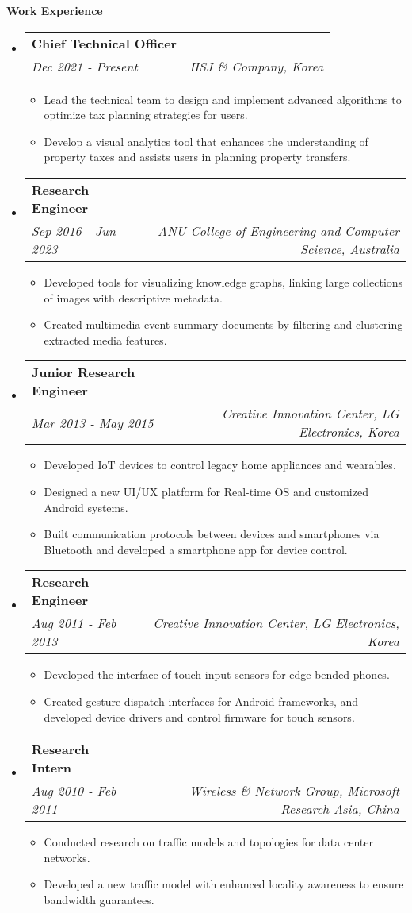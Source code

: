 \documentclass[letterpaper,11pt]{article}
\makeatletter
\newcommand{\resitem}[1]{\item #1 \vspace{-2pt}}
\newcommand{\resheading}[1]{{\large \colorbox{mygrey}{\begin{minipage}{\textwidth}{\textbf{#1 \vphantom{p\^{E}}}}\end{minipage}}}}
\newcommand{\ressubheading}[3]{
\begin{tabular*}{7.0in}{l@{\extracolsep{\fill}}r}
		\textbf{#1} &  \\
		\textit{#3} & \textit{#2}\\
\end{tabular*}\vspace{-6pt}}
\makeatother
\begin{document}
\resheading{Work Experience}
\begin{itemize}
\item
	\ressubheading{Chief Technical Officer}{HSJ \& Company, Korea}{Dec 2021 - Present}
	\begin{itemize}
		\resitem{Lead the technical team to design and implement advanced algorithms to optimize tax planning strategies for users.}
		\resitem{Develop a visual analytics tool that enhances the understanding of property taxes and assists users in planning property transfers.}
	\end{itemize}

\item
	\ressubheading{Research Engineer}{ANU College of Engineering and Computer Science, Australia}{Sep 2016 - Jun 2023}
	\begin{itemize}
		\resitem{Developed tools for visualizing knowledge graphs, linking large collections of images with descriptive metadata.}
		\resitem{Created multimedia event summary documents by filtering and clustering extracted media features.}
	\end{itemize}
	
\item
	\ressubheading{Junior Research Engineer}{Creative Innovation Center, LG Electronics, Korea}{Mar 2013 - May 2015}
	\begin{itemize}
		\resitem{Developed IoT devices to control legacy home appliances and wearables.}
		\resitem{Designed a new UI/UX platform for Real-time OS and customized Android systems.}
		\resitem{Built communication protocols between devices and smartphones via Bluetooth and developed a smartphone app for device control.}
	\end{itemize}
\item
	\ressubheading{Research Engineer}{Creative Innovation Center, LG Electronics, Korea}{Aug 2011 - Feb 2013}
	\begin{itemize}
		\resitem{Developed the interface of touch input sensors for edge-bended phones.}
		\resitem{Created gesture dispatch interfaces for Android frameworks, and developed device drivers and control firmware for touch sensors.}
	\end{itemize}

\item
	\ressubheading{Research Intern}{Wireless \& Network Group, Microsoft Research Asia, China}{Aug 2010 - Feb 2011}
	\begin{itemize}
		\resitem{Conducted research on traffic models and topologies for data center networks.}
        \resitem{Developed a new traffic model with enhanced locality awareness to ensure bandwidth guarantees.}
	\end{itemize}


\end{itemize}
\end{document}
